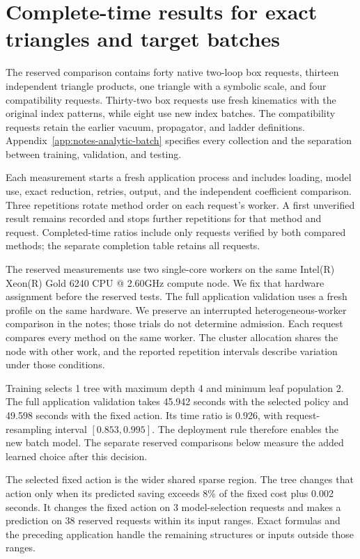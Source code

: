 \section{Complete-time results for exact triangles and target batches}
\label{sec:notes-analytic-batch-results}
The reserved comparison contains forty native two-loop box requests, thirteen independent triangle products, one triangle with a symbolic scale, and four compatibility requests. Thirty-two box requests use fresh kinematics with the original index patterns, while eight use new index batches. The compatibility requests retain the earlier vacuum, propagator, and ladder definitions. Appendix~\ref{app:notes-analytic-batch} specifies every collection and the separation between training, validation, and testing.

Each measurement starts a fresh application process and includes loading, model use, exact reduction, retries, output, and the independent coefficient comparison. Three repetitions rotate method order on each request's worker. A first unverified result remains recorded and stops further repetitions for that method and request. Completed-time ratios include only requests verified by both compared methods; the separate completion table retains all requests.

The reserved measurements use two single-core workers on the same Intel(R) Xeon(R) Gold 6240 CPU @ 2.60GHz compute node. We fix that hardware assignment before the reserved tests. The full application validation uses a fresh profile on the same hardware. We preserve an interrupted heterogeneous-worker comparison in the notes; those trials do not determine admission. Each request compares every method on the same worker. The cluster allocation shares the node with other work, and the reported repetition intervals describe variation under those conditions.

Training selects 1 tree with maximum depth 4 and minimum leaf population 2. The full application validation takes 45.942 seconds with the selected policy and 49.598 seconds with the fixed action. Its time ratio is 0.926, with request-resampling interval $[0.853,0.995]$. The deployment rule therefore enables the new batch model. The separate reserved comparisons below measure the added learned choice after this decision.

The selected fixed action is the wider shared sparse region. The tree changes that action only when its predicted saving exceeds 8\% of the fixed cost plus 0.002 seconds. It changes the fixed action on 3 model-selection requests and makes a prediction on 38 reserved requests within its input ranges. Exact formulas and the preceding application handle the remaining structures or inputs outside those ranges.

